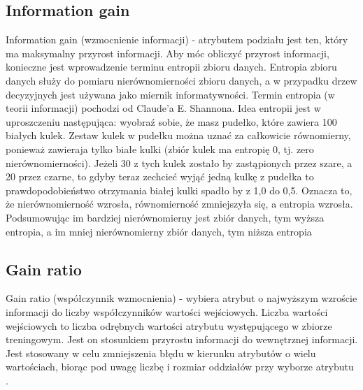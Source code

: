 \documentclass[10pt,a4paper]{article}
\begin{document}
\subsection{Information gain}
Information gain (wzmocnienie informacji) - atrybutem podziału jest ten, który ma maksymalny przyrost informacji. Aby móc obliczyć przyrost informacji, konieczne jest wprowadzenie terminu entropii zbioru danych. Entropia zbioru danych służy do pomiaru nierównomierności zbioru danych, a w przypadku drzew decyzyjnych jest używana jako miernik informatywności. Termin entropia (w teorii informacji) pochodzi od Claude'a E. Shannona. Idea entropii jest w uproszczeniu następująca: wyobraź sobie, że masz pudełko, które zawiera 100 białych kulek. Zestaw kulek w pudełku można uznać za całkowicie równomierny, ponieważ zawieraja tylko białe kulki (zbiór kulek ma entropię 0, tj. zero nierównomierności). Jeżeli 30 z tych kulek zostało by zastąpionych przez szare, a 20 przez czarne, to gdyby teraz zechcieć wyjąć jedną kulkę z pudełka to prawdopodobieństwo otrzymania białej kulki spadło by z 1,0 do 0,5. Oznacza to, że nierównomierność wzrosła, równomierność zmniejszyła się, a entropia wzrosła. Podsumowując im bardziej nierównomierny jest zbiór danych, tym wyższa entropia, a im mniej nierównomierny zbiór danych, tym niższa entropia \cite{MazumdarWWW, AnalyticsWWW}

\subsection{Gain ratio}
Gain ratio (współczynnik wzmocnienia) - wybiera atrybut o najwyższym wzroście informacji do liczby współczynników wartości wejściowych. Liczba wartości wejściowych to liczba odrębnych wartości atrybutu występującego w zbiorze treningowym. Jest on stosunkiem przyrostu informacji do wewnętrznej informacji. Jest stosowany w celu zmniejszenia błędu w kierunku atrybutów o wielu wartościach, biorąc pod uwagę liczbę i rozmiar oddziałów przy wyborze atrybutu \cite{AnalyticsWWW, AIspaceWWW, Brownlee2017}.
\end{document}
